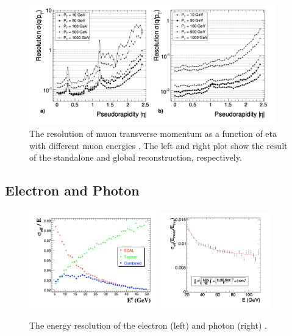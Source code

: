 \begin{figure}[ht]
    \centering
    \includegraphics[width=0.95\textwidth]{chapters/CMSExperiment/sectionReconstruction/figures/resMu.png}
    \caption{The resolution of muon transverse momentum as a function of eta with different muon energies \cite{cms:tdr1:Bayatian:2006nff} . The left and right plot show the result of the standalone and global reconstruction, respectively.}
    \label{fig:cmsexperiment:reconstruction:resMu}
\end{figure}





\subsection{Electron and Photon}

\begin{figure}[ht]
    \centering
    \includegraphics[width=0.5\textwidth]{chapters/CMSExperiment/sectionReconstruction/figures/resEle.png}
    \includegraphics[width=0.42\textwidth]{chapters/CMSExperiment/sectionReconstruction/figures/resGamma.png}
    \caption{The energy resolution of the electron (left) and photon (right) \cite{cms:tdr1:Bayatian:2006nff}.  }
    \label{fig:cmsexperiment:reconstruction:resEle}
\end{figure}

